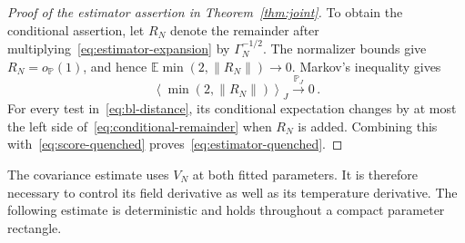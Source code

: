 \documentclass[11pt]{amsart}
\numberwithin{equation}{section}
\theoremstyle{remark}
\newcommand{\E}{\mathbb E}
\newcommand{\Pp}{\mathbb P}
\begin{document}
\begin{proof}[Proof of the estimator assertion in Theorem~\ref{thm:joint}]
To obtain the conditional assertion, let $R_N$ denote the remainder after multiplying~\eqref{eq:estimator-expansion} by $\Gamma_N^{-1/2}$. The normalizer bounds give $R_N=o_{\Pp}(1)$, and hence $\E\min(2,\|R_N\|)\to0$. Markov's inequality gives
\begin{equation}
 \left\langle\min(2,\|R_N\|)\right\rangle_J
 \xrightarrow{\Pp_J}0\,.
 \label{eq:conditional-remainder}
\end{equation}
For every test in~\eqref{eq:bl-distance}, its conditional expectation changes by at most the left side of~\eqref{eq:conditional-remainder} when $R_N$ is added. Combining this with~\eqref{eq:score-quenched} proves~\eqref{eq:estimator-quenched}.
\end{proof}

The covariance estimate uses $V_N$ at both fitted parameters. It is therefore necessary to control its field derivative as well as its temperature derivative. The following estimate is deterministic and holds throughout a compact parameter rectangle.
\end{document}

